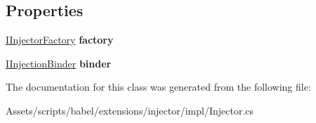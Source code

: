 \subsection*{Properties}
\begin{DoxyCompactItemize}
\item 
\hypertarget{classbabel_1_1extensions_1_1injector_1_1impl_1_1_injector_a861a558081e8e111915bbc6bce9acaba}{\hyperlink{interfacebabel_1_1extensions_1_1injector_1_1api_1_1_i_injector_factory}{I\-Injector\-Factory} {\bfseries factory}}\label{classbabel_1_1extensions_1_1injector_1_1impl_1_1_injector_a861a558081e8e111915bbc6bce9acaba}

\item 
\hypertarget{classbabel_1_1extensions_1_1injector_1_1impl_1_1_injector_ab6042a9876d43dc3adec082c63610824}{\hyperlink{interfacebabel_1_1extensions_1_1injector_1_1api_1_1_i_injection_binder}{I\-Injection\-Binder} {\bfseries binder}}\label{classbabel_1_1extensions_1_1injector_1_1impl_1_1_injector_ab6042a9876d43dc3adec082c63610824}

\end{DoxyCompactItemize}


The documentation for this class was generated from the following file\-:\begin{DoxyCompactItemize}
\item 
Assets/scripts/babel/extensions/injector/impl/Injector.\-cs\end{DoxyCompactItemize}
